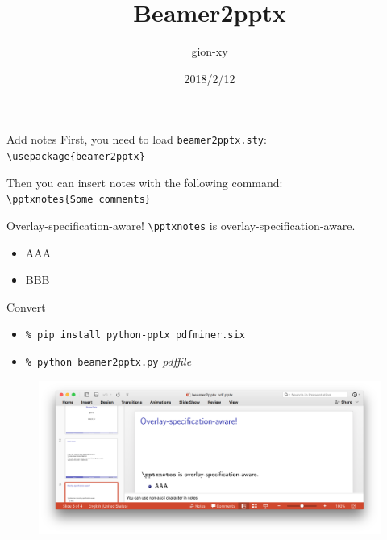 \documentclass{beamer}
\title{Beamer2pptx}
\author{gion-xy}
\date{2018/2/12}
\begin{document}
\frame{\titlepage}

\begin{frame}{Add notes}
  First, you need to load \texttt{beamer2pptx.sty}: \\
  \texttt{\textbackslash usepackage\{beamer2pptx\}}

  Then you can insert notes with the following command: \\
  \texttt{\textbackslash pptxnotes\{Some comments\}}

\end{frame}


\begin{frame}{Overlay-specification-aware!}
  \texttt{\textbackslash pptxnotes} is overlay-specification-aware.

  \begin{itemize}[<+->]
  \item AAA
  \item BBB
  \end{itemize}

\end{frame}


\begin{frame}{Convert}
  \begin{itemize}
  \item \texttt{\% pip install python-pptx pdfminer.six}
  \item \texttt{\% python beamer2pptx.py} \textit{pdffile}
  \end{itemize}

  \begin{figure}
    \centering
    \includegraphics[width=\textwidth]{pptx-with-notes.png}
  \end{figure}
\end{frame}
\end{document}
